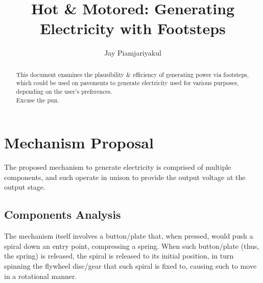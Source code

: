 \documentclass[conference]{ieeetran}
\author[1]{Jay Piamjariyakul}
\affil[1]{Undergraduate, Department of Electrical \& Electronic Engineering, University of Bristol}
\title{Hot \& Motored: Generating Electricity with Footsteps}
\begin{document}
\maketitle
\begin{abstract}
This document examines the plausibility \& efficiency of generating power via footsteps, which could be used on pavements to generate electricity used for various purposes, depending on the user's preferences.
\\
Excuse the pun.
\end{abstract}

 

\section{Mechanism Proposal}
The proposed mechanism to generate electricity is comprised of multiple components, and such operate in unison to provide the output voltage at the output stage.

\subsection{Components Analysis}
The mechanism itself involves a button/plate that, when pressed, would push a spiral down an entry point, compressing a spring. When such button/plate (thus, the spring) is released, the spiral is released to its initial position, in turn spinning the flywheel disc/gear that such spiral is fixed to, causing such to move in a rotational manner.
\end{document}
